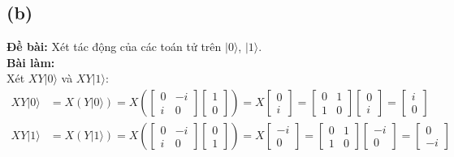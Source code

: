 \subsection{(b)}
\textbf{Đề bài:} Xét tác động của các toán tử trên $|0\rangle$, $|1\rangle$.\\
\textbf{Bài làm:}\\
Xét $XY|0\rangle$ và $XY|1\rangle$:
\begin{align*}
    XY|0\rangle & = X(Y|0\rangle) = X\left(\begin{bmatrix}
                                               0 & -i \\
                                               i & 0
                                           \end{bmatrix}
    \begin{bmatrix}
        1 \\
        0
    \end{bmatrix}\right)
    = X\begin{bmatrix}
           0 \\
           i
       \end{bmatrix}
    = \begin{bmatrix}
          0 & 1 \\
          1 & 0
      \end{bmatrix}
    \begin{bmatrix}
        0 \\
        i
    \end{bmatrix}
    = \begin{bmatrix}
          i \\
          0
      \end{bmatrix}                                      \\
    XY|1\rangle & = X(Y|1\rangle) = X\left(\begin{bmatrix}
                                               0 & -i \\
                                               i & 0
                                           \end{bmatrix}
    \begin{bmatrix}
        0 \\
        1
    \end{bmatrix}\right)
    = X\begin{bmatrix}
           -i \\
           0
       \end{bmatrix}
    = \begin{bmatrix}
          0 & 1 \\
          1 & 0
      \end{bmatrix}
    \begin{bmatrix}
        -i \\
        0
    \end{bmatrix}
    = \begin{bmatrix}
          0 \\
          -i
      \end{bmatrix}
\end{align*}
